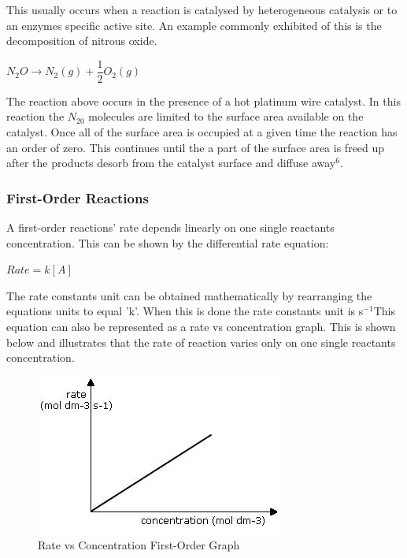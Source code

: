This usually occurs when a reaction is catalysed by heterogeneous catalysis or to an enzymes specific active site. An example commonly exhibited of this is the decomposition of nitrous oxide.

$N_2O \rightarrow N_2(g) + \dfrac{1}{2} O_2(g)$

The reaction above occurs in the presence of a hot platinum wire catalyst. In this reaction the $N_20$ molecules are limited to the surface area available on the catalyst. Once all of the surface area is occupied at a given time the reaction has an order of zero. This continues until the a part of the surface area is freed up after the products desorb from the catalyst surface and diffuse away$^6$.



\subsubsection{First-Order Reactions}

A first-order reactions' rate depends linearly on one single reactants concentration. This can be shown by the differential rate equation:

$Rate = k[A]$

The rate constants unit can be obtained mathematically by rearranging the equations units to equal 'k'. When this is done the rate constants unit is s$^{-1}$This equation can also be represented as a rate vs concentration graph. This is shown below and illustrates that the rate of reaction varies only on one single reactants concentration.


\begin{figure}[H]
    \includegraphics[width=\textwidth]{./Planning/Images/FirstOrder.jpg}
    \caption{ Rate vs Concentration First-Order Graph} \label{fig:First Order Graph}
\end{figure}

